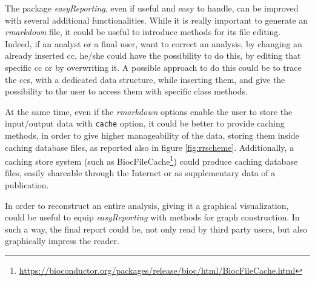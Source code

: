 The package \textit{easyReporting}, even if useful and easy to handle, can be improved with several additional functionalities.
While it is really important to generate an \textit{rmarkdown} file, it could be useful to introduce methods for its file editing. 
Indeed, if an analyst or a final user, want to correct an analysis, by changing an already inserted \gls{cc}, he/she could have the possibility to do this, by editing that specific \gls{cc} or by overwriting it.
A possible approach to do this could be to trace the \glspl{cc}, with a dedicated data structure, while inserting them, and give the possibility to the user to access them with specific class methods.

At the same time, even if the \textit{rmarkdown} options enable the user to store the input/output data with \lstinline!cache! option, it could be better to provide caching methods, in order to give higher manageability of the data, storing them inside caching database files, as reported also in figure \ref{fig:rrscheme}.
Additionally, a caching store system (such as BiocFileCache\footnote{\url{https://bioconductor.org/packages/release/bioc/html/BiocFileCache.html}}) could produce caching database files, easily shareable through the Internet or as supplementary data of a publication.

In order to reconstruct an entire analysis, giving it a graphical visualization, could be useful to equip \textit{easyReporting} with methods for graph construction.
In such a way, the final report could be, not only read by third party users, but also graphically impress the reader.


